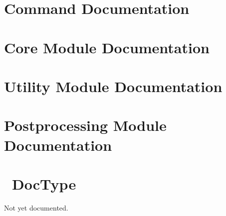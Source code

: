 \documentclass{report}
\begin{document}
\printindex\label{idx}
\appendix
\chapter{Command Documentation}\label{commands}



\chapter{Core Module Documentation}\label{coremodules}
























\chapter{Utility Module Documentation}\label{utilitymodules}


\chapter{Postprocessing Module Documentation}\label{postmodules}


\chapter{\LaTeXML\ DocType}\label{dtd}
Not yet documented.
\end{document}
